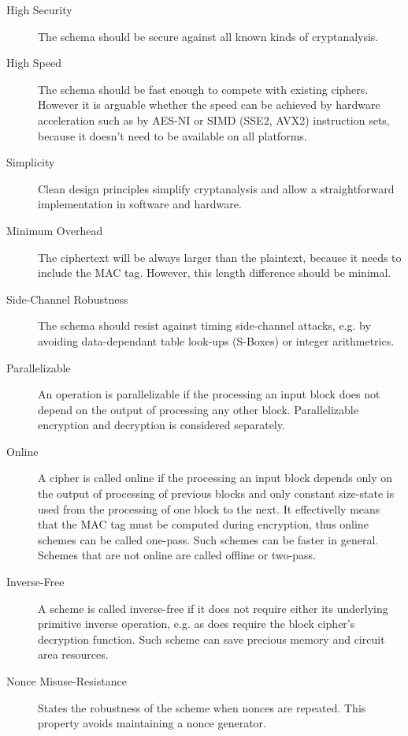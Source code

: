 \begin{description}
  \item[High Security] The schema should be secure against all known kinds of cryptanalysis.
  \item[High Speed] The schema should be fast enough to compete with existing ciphers. However it is arguable whether the speed can be achieved by hardware acceleration such as by AES-NI or SIMD (SSE2, AVX2) instruction sets, because it doesn't need to be available on all platforms.
  \item[Simplicity] Clean design principles simplify cryptanalysis and allow a straightforward implementation in software and hardware.
  \item[Minimum Overhead] The ciphertext will be always larger than the plaintext, because it needs to include the MAC tag. However, this length difference should be minimal.
  \item[Side-Channel Robustness] The schema should resist against timing side-channel attacks, e.g. by avoiding data-dependant table look-ups (S-Boxes) or integer arithmetrics.
  \item[Parallelizable] An operation is parallelizable if the processing an input block does not depend on the output of processing any other block. Parallelizable encryption and decryption is considered separately.
  \item[Online] A cipher is called online if the processing an input block depends only on the output of processing of previous blocks and only constant size-state is used from the processing of one block to the next. It effectivelly means that the MAC tag must be computed during encryption, thus online schemes can be called one-pass. Such schemes can be faster in general. Schemes that are not online are called offline or two-pass.
  \item[Inverse-Free] A scheme is called inverse-free if it does not require either its underlying primitive inverse operation, e.g. as does require the block cipher's decryption function. Such scheme can save precious memory and circuit area resources.
  \item[Nonce Misuse-Resistance] States the robustness of the scheme when nonces are repeated. This property avoids maintaining a nonce generator.
\end{description}
